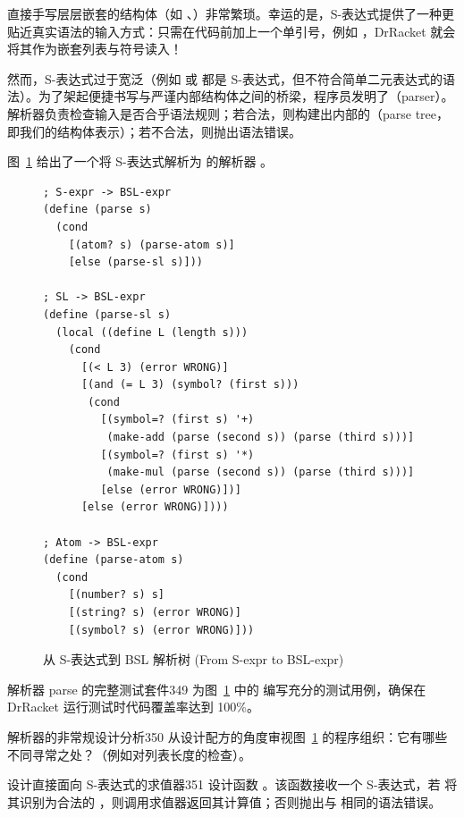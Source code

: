 直接手写层层嵌套的结构体（如 、）非常繁琐。幸运的是，S-表达式提供了一种更贴近真实语法的输入方式：只需在代码前加上一个单引号，例如 ，DrRacket 就会将其作为嵌套列表与符号读入！

然而，S-表达式过于宽泛（例如  或  都是 S-表达式，但不符合简单二元表达式的语法）。为了架起便捷书写与严谨内部结构体之间的桥梁，程序员发明了（parser）。解析器负责检查输入是否合乎语法规则；若合法，则构建出内部的（parse tree，即我们的结构体表示）；若不合法，则抛出语法错误。

图~\ref{fig:125} 给出了一个将 S-表达式解析为  的解析器 。

\begin{figure}[htbp]
  \centering
\begin{lstlisting}[language=BSL, basicstyle=\scriptsize\ttfamily]
; S-expr -> BSL-expr
(define (parse s)
  (cond
    [(atom? s) (parse-atom s)]
    [else (parse-sl s)]))

; SL -> BSL-expr
(define (parse-sl s)
  (local ((define L (length s)))
    (cond
      [(< L 3) (error WRONG)]
      [(and (= L 3) (symbol? (first s)))
       (cond
         [(symbol=? (first s) '+)
          (make-add (parse (second s)) (parse (third s)))]
         [(symbol=? (first s) '*)
          (make-mul (parse (second s)) (parse (third s)))]
         [else (error WRONG)])]
      [else (error WRONG)])))

; Atom -> BSL-expr
(define (parse-atom s)
  (cond
    [(number? s) s]
    [(string? s) (error WRONG)]
    [(symbol? s) (error WRONG)]))
\end{lstlisting}
  \caption{从 S-表达式到 BSL 解析树 (From S-expr to BSL-expr)}
  \label{fig:125}
\end{figure}

\begin{exercise}{解析器 parse 的完整测试套件}{349}
为图~\ref{fig:125} 中的  编写充分的测试用例，确保在 DrRacket 运行测试时代码覆盖率达到 100\%。
\end{exercise}

\begin{exercise}{解析器的非常规设计分析}{350}
从设计配方的角度审视图~\ref{fig:125} 的程序组织：它有哪些不同寻常之处？（例如对列表长度的检查）。
\end{exercise}

\begin{exercise}{设计直接面向 S-表达式的求值器}{351}
设计函数 。该函数接收一个 S-表达式，若  将其识别为合法的 ，则调用求值器返回其计算值；否则抛出与  相同的语法错误。
\end{exercise}

